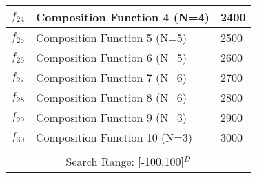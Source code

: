 \begin{table}[!htbp]
\begin{tabular}{|p{0.5cm}|p{5.4cm}|p{0.6cm}|}
$f_{24}$ & Composition Function 4 (N=4) & 2400\\
\hline
$f_{25}$ & Composition Function 5 (N=5) & 2500\\
\hline
$f_{26}$ & Composition Function 6 (N=5) & 2600\\
\hline
$f_{27}$ & Composition Function 7 (N=6) & 2700\\
\hline
$f_{28}$ & Composition Function 8 (N=6) & 2800 \\
\hline
$f_{29}$ & Composition Function 9 (N=3) & 2900 \\
\hline
$f_{30}$ & Composition Function 10 (N=3) & 3000 \\
\hline
\multicolumn{3}{|c|}{ } \\[0.05ex]
\multicolumn{3}{|c|}{Search Range: [-100,100]$^{D}$ } \\
\hline
\end{tabular}
\vspace{-1mm}
\end{table}


